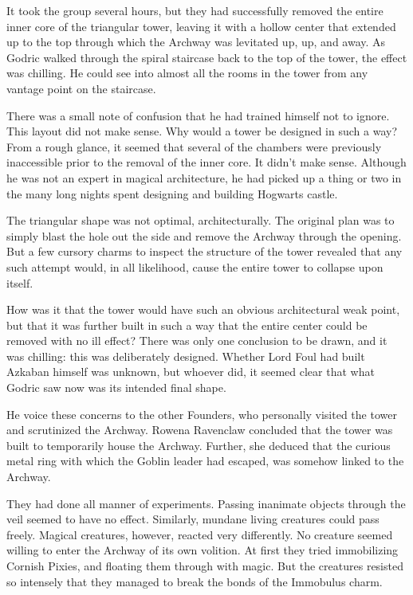 It took the group several hours, but they had successfully removed the entire inner core of the triangular tower, leaving it with a hollow center that extended up to the top through which the Archway was levitated up, up, and away. As Godric walked through the spiral staircase back to the top of the tower, the effect was chilling. He could see into almost all the rooms in the tower from any vantage point on the staircase.

There was a small note of confusion that he had trained himself not to ignore. This layout did not make sense. Why would a tower be designed in such a way? From a rough glance, it seemed that several of the chambers were previously inaccessible prior to the removal of the inner core. It didn’t make sense. Although he was not an expert in magical architecture, he had picked up a thing or two in the many long nights spent designing and building Hogwarts castle.

The triangular shape was not optimal, architecturally. The original plan was to simply blast the hole out the side and remove the Archway through the opening. But a few cursory charms to inspect the structure of the tower revealed that any such attempt would, in all likelihood, cause the entire tower to collapse upon itself.

How was it that the tower would have such an obvious architectural weak point, but that it was further built in such a way that the entire center could be removed with no ill effect? There was only one conclusion to be drawn, and it was chilling: this was deliberately designed. Whether Lord Foul had built Azkaban himself was unknown, but whoever did, it seemed clear that what Godric saw now was its intended final shape.

He voice these concerns to the other Founders, who personally visited the tower and scrutinized the Archway. Rowena Ravenclaw concluded that the tower was built to temporarily house the Archway. Further, she deduced that the curious metal ring with which the Goblin leader had escaped, was somehow linked to the Archway.

They had done all manner of experiments. Passing inanimate objects through the veil seemed to have no effect. Similarly, mundane living creatures could pass freely. Magical creatures, however, reacted very differently. No creature seemed willing to enter the Archway of its own volition. At first they tried immobilizing Cornish Pixies, and floating them through with magic. But the creatures resisted so intensely that they managed to break the bonds of the Immobulus charm.

